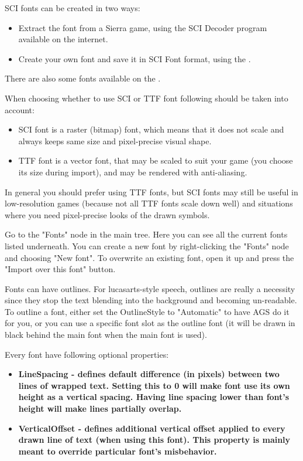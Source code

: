 SCI fonts can be created in two ways:
\begin{itemize}
\item Extract the font from a Sierra game, using the SCI Decoder program
available on the internet.
\item Create your own font and save it in SCI Font format, using the
.
\end{itemize}
There are also some fonts available on the
.

When choosing whether to use SCI or TTF font following should be taken into account:
\begin{itemize}
\item SCI font is a raster (bitmap) font, which means that it does not scale and always keeps same size and pixel-precise visual shape.
\item TTF font is a vector font, that may be scaled to suit your game (you choose its size during import), and may be rendered with anti-aliasing.
\end{itemize}

In general you should prefer using TTF fonts, but SCI fonts may still be useful in low-resolution games (because not all TTF fonts scale down well) and situations where you need pixel-precise looks of the drawn symbols.

Go to the "Fonts" node in the main tree. Here you can see all the current fonts
listed underneath. You can create a new font by right-clicking the "Fonts" node
and choosing "New font". To overwrite an existing font, open it up and
press the "Import over this font" button.

Fonts can have outlines. For lucasarts-style speech, outlines are really a
necessity since they stop the text blending into the background and becoming
un-readable. To outline a font, either set the OutlineStyle to "Automatic" to
have AGS do it for you, or you can use a specific font slot as the outline font
(it will be drawn in black behind the main font when the main font is used).

Every font have following optional properties:
\begin{itemize}
\item \bf{LineSpacing} - defines default difference (in pixels) between two lines of wrapped text. Setting this to 0 will make font use its own height as a vertical spacing. Having line spacing lower than font's height will make lines partially overlap.
\item \bf{VerticalOffset} - defines additional vertical offset applied to every drawn line of text (when using this font). This property is mainly meant to override particular font's misbehavior.
\end{itemize}

